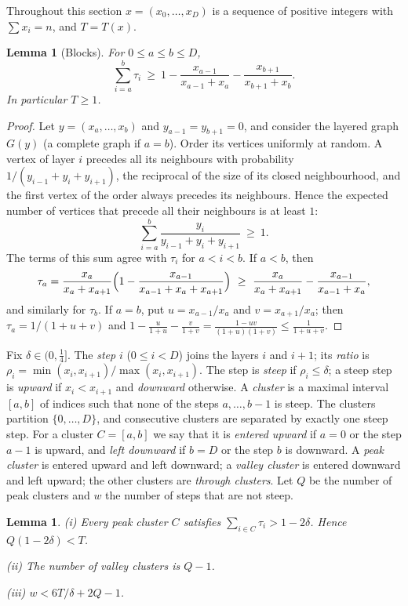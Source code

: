\documentclass[11pt]{amsart}
\newtheorem{lemma}[theorem]{Lemma}
\theoremstyle{definition}
\theoremstyle{remark}
\begin{document}
Throughout this section $x=(x_0,\dots,x_D)$ is a sequence of positive integers with $\sum x_i=n$, and $T=T(x)$.

\begin{lemma}[Blocks]\label{lem:block}
For $0\le a\le b\le D$,
\[
\sum_{i=a}^{b}\tau_i\ \ge\ 1-\frac{x_{a-1}}{x_{a-1}+x_a}-\frac{x_{b+1}}{x_{b+1}+x_b}.
\]
In particular $T\ge1$.
\end{lemma}

\begin{proof}
Let $y=(x_a,\dots,x_b)$ and $y_{a-1}=y_{b+1}=0$, and consider the layered graph $G(y)$ (a complete graph if $a=b$). Order its vertices uniformly at random. A vertex of layer $i$ precedes all its neighbours with probability $1/(y_{i-1}+y_i+y_{i+1})$, the reciprocal of the size of its closed neighbourhood, and the first vertex of the order always precedes its neighbours. Hence the expected number of vertices that precede all their neighbours is at least $1$:
\[
\sum_{i=a}^{b}\frac{y_i}{y_{i-1}+y_i+y_{i+1}}\ \ge\ 1 .
\]
The terms of this sum agree with $\tau_i$ for $a<i<b$.
If $a<b$, then
\[
\tau_a=\frac{x_a}{x_a+x_{a+1}}\Bigl(1-\frac{x_{a-1}}{x_{a-1}+x_a+x_{a+1}}\Bigr)\ \ge\ \frac{x_a}{x_a+x_{a+1}}-\frac{x_{a-1}}{x_{a-1}+x_a},
\]
and similarly for $\tau_b$.
If $a=b$, put $u=x_{a-1}/x_a$ and $v=x_{a+1}/x_a$; then $\tau_a=1/(1+u+v)$ and
$1-\frac u{1+u}-\frac v{1+v}=\frac{1-uv}{(1+u)(1+v)}\le\frac1{1+u+v}$.
\end{proof}

Fix $\delta\in(0,\tfrac14]$.
The \emph{step} $i$ ($0\le i<D$) joins the layers $i$ and $i+1$; its \emph{ratio} is $\rho_i=\min(x_i,x_{i+1})/\max(x_i,x_{i+1})$.
The step is \emph{steep} if $\rho_i\le\delta$; a steep step is \emph{upward} if $x_i<x_{i+1}$ and \emph{downward} otherwise.
A \emph{cluster} is a maximal interval $[a,b]$ of indices such that none of the steps $a,\dots,b-1$ is steep.
The clusters partition $\{0,\dots,D\}$, and consecutive clusters are separated by exactly one steep step.
For a cluster $C=[a,b]$ we say that it is \emph{entered upward} if $a=0$ or the step $a-1$ is upward, and \emph{left downward} if $b=D$ or the step $b$ is downward.
A \emph{peak cluster} is entered upward and left downward; a \emph{valley cluster} is entered downward and left upward; the other clusters are \emph{through clusters}.
Let $Q$ be the number of peak clusters and $w$ the number of steps that are not steep.

\begin{lemma}\label{lem:peaks}
{\rm(i)} Every peak cluster $C$ satisfies $\sum_{i\in C}\tau_i>1-2\delta$. Hence $Q(1-2\delta)<T$.

{\rm(ii)} The number of valley clusters is $Q-1$.

{\rm(iii)} $w<6T/\delta+2Q-1$.
\end{lemma}
\end{document}

